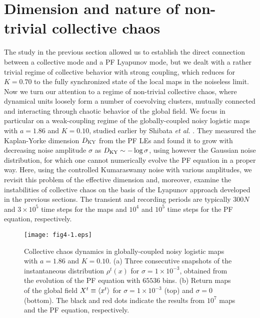 \documentclass[12pt]{iopart}
\begin{document}
\section{Dimension and nature of non-trivial collective chaos}  \label{sec:ColChaos}

The study in the previous section
 allowed us to establish the direct connection between
 a collective mode and a PF Lyapunov mode,
 but we dealt with a rather trivial regime of collective behavior
 with strong coupling, which reduces for $K=0.70$
 to the fully synchronized state of the local maps in the noiseless limit.
Now we turn our attention to a regime of non-trivial collective chaos,
 where dynamical units loosely form a number of coevolving clusters,
 mutually connected and interacting
 through chaotic behavior of the global field.
We focus in particular on a weak-coupling regime
 of the globally-coupled noisy logistic maps 
 with $a=1.86$ and $K=0.10$,
 studied earlier by Shibata \textit{et al.} \cite{Shibata.etal-PRL1999}.
They measured the Kaplan-Yorke dimension $D_{\rm KY}$ from the PF LEs
 and found it to grow with decreasing noise amplitude $\sigma$ as
 $D_{\rm KY} \sim -\log\sigma$, using however the Gaussian noise distribution,
 for which one cannot numerically evolve the PF equation 
 in a proper way.
Here, using the controlled Kumaraswamy noise with various amplitudes,
 we revisit this problem of the effective dimension and, moreover,
 examine the instabilities of collective chaos
 on the basis of the Lyapunov approach developed in the previous sections.
The transient and recording periods are typically
 $300N$ and $3 \times 10^5$ time steps for the maps
 and $10^4$ and $10^5$ time steps for the PF equation,
 respectively.

\begin{figure}[t]
 \begin{center}
  \texttt{[image: fig4-1.eps]}
  \caption{Collective chaos dynamics in globally-coupled noisy logistic maps  with $a=1.86$ and $K=0.10$. (a) Three consecutive snapshots of the instantaneous distribution $\rho^t(x)$ for $\sigma = 1 \times 10^{-3}$, obtained from the evolution of the PF equation  with $65536$ bins. (b) Return maps of the global field $X^t \equiv \langle x^t \rangle$ for $\sigma = 1 \times 10^{-3}$ (top) and $\sigma = 0$ (bottom). The black and red dots indicate the results from $10^7$ maps and the PF equation, respectively.}
  \label{fig:4-1}
 \end{center}
\end{figure}%
\end{document}
